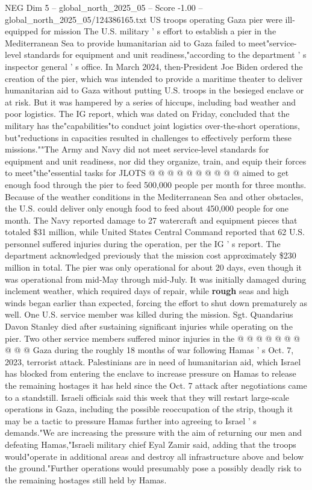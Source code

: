 \begin{textsample}{NEG Dim 5 – global\_north\_2025\_05 – Score -1.00 – global\_north\_2025\_05/124386165.txt}  \label{ex:f5_neg_327}
US troops operating Gaza pier were ill-equipped for mission The U.S. military ' s effort to establish a pier in the Mediterranean Sea to provide humanitarian aid to Gaza failed to meet"service-level standards for equipment and unit readiness,"according to the department ' s inspector general ' s office.
In March 2024, then-President Joe Biden ordered the creation of the pier, which was intended to provide a maritime theater to deliver humanitarian aid to Gaza without putting U.S. troops in the besieged enclave or at risk.
But it was hampered by a series of hiccups, including bad weather and poor logistics.
The IG report, which was dated on Friday, concluded that the military has the"capabilities"to conduct joint logistics over-the-short operations, but"reductions in capacities resulted in challenges to effectively perform these missions.""The Army and Navy did not meet service-level standards for equipment and unit readiness, nor did they organize, train, and equip their forces to meet"the"essential tasks for JLOTS @ @ @ @ @ @ @ @ @ @ aimed to get enough food through the pier to feed 500,000 people per month for three months.
Because of the weather conditions in the Mediterranean Sea and other obstacles, the U.S. could deliver only enough food to feed about 450,000 people for one month.
The Navy reported damage to 27 watercraft and equipment pieces that totaled \$31 million, while United States Central Command reported that 62 U.S. personnel suffered injuries during the operation, per the IG ' s report.
The department acknowledged previously that the mission cost approximately \$230 million in total.
The pier was only operational for about 20 days, even though it was operational from mid-May through mid-July.
It was initially damaged during inclement weather, which required days of repair, while \textbf{rough} seas and high winds began earlier than expected, forcing the effort to shut down prematurely as well.
One U.S. service member was killed during the mission.
Sgt.
Quandarius Davon Stanley died after sustaining significant injuries while operating on the pier.
Two other service members suffered minor injuries in the @ @ @ @ @ @ @ @ @ @ Gaza during the roughly 18 months of war following Hamas ' s Oct. 7, 2023, terrorist attack.
Palestinians are in need of humanitarian aid, which Israel has blocked from entering the enclave to increase pressure on Hamas to release the remaining hostages it has held since the Oct. 7 attack after negotiations came to a standstill.
Israeli officials said this week that they will restart large-scale operations in Gaza, including the possible reoccupation of the strip, though it may be a tactic to pressure Hamas further into agreeing to Israel ' s demands."We are increasing the pressure with the aim of returning our men and defeating Hamas,"Israeli military chief Eyal Zamir said, adding that the troops would"operate in additional areas and destroy all infrastructure above and below the ground."Further operations would presumably pose a possibly deadly risk to the remaining hostages still held by Hamas.

\end{textsample}
